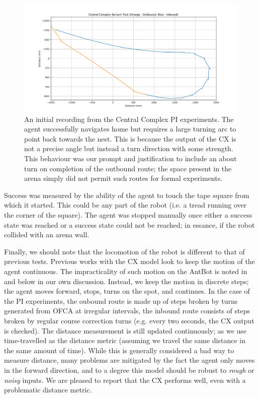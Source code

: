\documentclass[a4paper,11pt,twoside,openright]{article}
\begin{document}
\begin{figure}[h!]
  \centering
  \includegraphics[width=\textwidth]{CXNT}
  \caption{\label{fig:cxnt} An initial recording from the Central Complex
    PI experiments. The agent successfully navigates home but requires a large
    turning arc to point back towards the nest. This is because the output of the
    CX is not a precise angle but instead a turn direction with some strength.
    This behaviour was our prompt and justification to include an about turn on
    completion of the outbound route; the space present in the arena simply did
    not permit such routes for formal experiments.
  }
\end{figure}

Success was measured by the ability of the agent to touch the tape
square from which it started. This could be any part of the robot
(i.e. a tread running over the corner of the square). The agent was
stopped manually once either a success state was reached or a success
state could not be reached; in essance, if the robot collided with an
arena wall.
\newline\par

Finally,  we should note that the locomotion of the robot is different to that of
previous tests. Previous works with the CX model look to keep the motion of the
agent continuous. The impracticality of such motion on the AntBot is noted in
\cite{Mitchell2018} and below in our own discussion. Instead, we keep the motion
in discrete steps; the agent moves forward, stops, turns on the spot, and
continues. In the case of the PI experiments, the oubound route is made up of
steps broken by turns generated from OFCA at irregular intervals, the inbound
route consists of steps broken by regular course correction turns (e.g. every two
seconds, the CX output is checked). The distance measurement is still updated
continuously; as we use time-travelled as the distance metric (assuming we
travel the same distance in the same amount of time). While this is generally
considered a bad way to measure distance, many problems are mitigated by the
fact the agent only moves in the forward direction, and to a degree this model
should be robust to \textit{rough} or \textit{noisy} inputs. We are pleased to
report that the CX performs well, even with a problematic distance metric.
\end{document}
